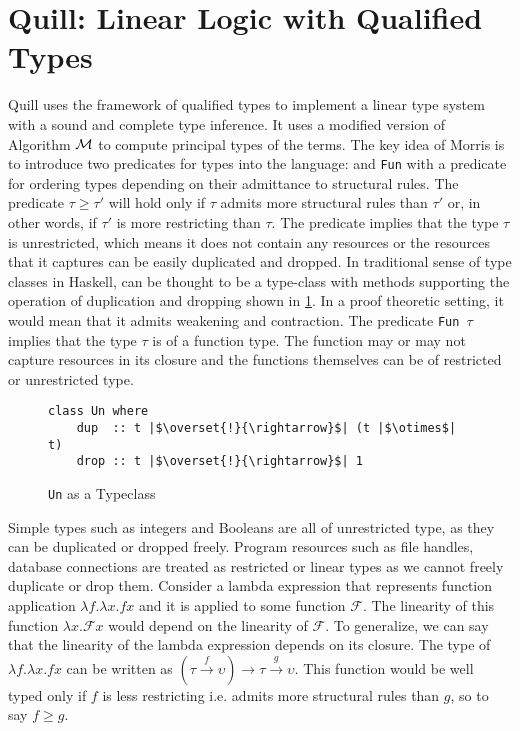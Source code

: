 \section{Quill: Linear Logic with Qualified Types}\label{sec:quill}
Quill\citep{morris_best_2016} uses the framework of qualified types to implement a linear type system with a sound and complete type inference.
It uses a modified version of Algorithm $\mathcal{M}$ to compute principal types of the terms.
The key idea of Morris is to introduce two predicates for types into the language: \Un and \texttt{Fun} with a predicate for ordering
types depending on their admittance to structural rules. The predicate $\tau \geq \tau'$ will hold only if $\tau$ admits more
structural rules than $\tau'$ or, in other words, if $\tau'$ is more restricting than $\tau$.
The predicate \Un{$\tau$} implies that the type $\tau$ is unrestricted, which means it does not
contain any resources or the resources that it captures can be easily duplicated and dropped.
In traditional sense of type classes in Haskell, \Un can be thought to be a type-class with methods supporting the operation
of duplication and dropping shown in \cref{fig:un-typeclass}. In a proof theoretic setting, it would mean
that it admits weakening and contraction. The predicate \texttt{Fun $\tau$} implies that the type $\tau$ is of a function type. The function
may or may not capture resources in its closure and the functions themselves can be of restricted or unrestricted type.
\begin{figure}[h]
  \begin{framed}\centering
    \begin{verbatim}
class Un where
    dup  :: t |$\overset{!}{\rightarrow}$| (t |$\otimes$| t)
    drop :: t |$\overset{!}{\rightarrow}$| 1
    \end{verbatim}
  \end{framed}
  \caption{\texttt{Un} as a Typeclass}
  \label{fig:un-typeclass}
\end{figure}

Simple types such as integers and Booleans are all of unrestricted type, as
they can be duplicated or dropped freely. Program resources such as file handles, database connections
are treated as restricted or linear types as we cannot freely duplicate
or drop them. Consider a lambda expression that represents function application $\lambda f. \lambda x. f x$ and it is applied to
some function $\mathcal{F}$. The linearity of this function $\lambda x. \mathcal{F} x$
would depend on the linearity of $\mathcal{F}$. To generalize, we can say that the linearity of the lambda expression depends
on its closure. The type of $\lambda f. \lambda x. f x$ can be written as $(\tau \overset{f}{\rightarrow} \upsilon) \rightarrow \tau \overset{g}{\rightarrow}\upsilon$.
This function would be well typed only if $f$ is less restricting i.e. admits more structural rules than $g$, so to say $f \geq g$.

